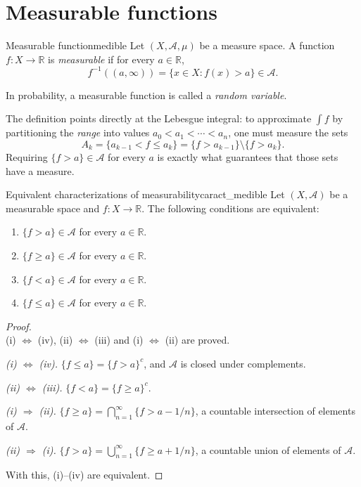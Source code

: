 \documentclass[11pt, a4paper]{article}
\begin{document}
\newpage

\section{Measurable functions}

\begin{definicion}{Measurable function}{medible}
Let $(X, \mathcal{A}, \mu)$ be a measure space. A function $f: X \to \mathbb{R}$ is
\emph{measurable} if for every $a \in \mathbb{R}$,
$$ f^{-1}((a, \infty)) = \{ x \in X : f(x) > a \} \in \mathcal{A}. $$
\end{definicion}

\obs In probability, a measurable function is called a \emph{random variable}.

\obs The definition points directly at the Lebesgue integral: to approximate $\int f$
by partitioning the \emph{range} into values $a_0 < a_1 < \cdots < a_n$, one must measure the sets
$$ A_k = \{a_{k-1} < f \le a_k\} = \{f > a_{k-1}\} \setminus \{f > a_k\}. $$
Requiring $\{f > a\} \in \mathcal{A}$ for every $a$ is exactly what guarantees that those
sets have a measure.

\begin{proposicion}{Equivalent characterizations of measurability}{caract_medible}
Let $(X, \mathcal{A})$ be a measurable space and $f: X \to \mathbb{R}$. The following conditions are
equivalent:
\begin{enumerate}
    \item $\{f > a\} \in \mathcal{A}$ for every $a \in \mathbb{R}$.
    \item $\{f \ge a\} \in \mathcal{A}$ for every $a \in \mathbb{R}$.
    \item $\{f < a\} \in \mathcal{A}$ for every $a \in \mathbb{R}$.
    \item $\{f \le a\} \in \mathcal{A}$ for every $a \in \mathbb{R}$.
\end{enumerate}
\end{proposicion}

\begin{proof}\leavevmode\\
(i) $\Leftrightarrow$ (iv), (ii) $\Leftrightarrow$ (iii) and (i) $\Leftrightarrow$ (ii) are proved.

\textit{(i) $\Leftrightarrow$ (iv).} $\{f \le a\} = \{f > a\}^c$, and $\mathcal{A}$ is closed under
complements.

\textit{(ii) $\Leftrightarrow$ (iii).} $\{f < a\} = \{f \ge a\}^c$.

\textit{(i) $\Rightarrow$ (ii).} $\{f \ge a\} = \bigcap_{n=1}^\infty \{f > a - 1/n\}$,
a countable
intersection of elements of $\mathcal{A}$.

\textit{(ii) $\Rightarrow$ (i).} $\{f > a\} = \bigcup_{n=1}^\infty \{f \ge a + 1/n\}$, a countable
union of elements of $\mathcal{A}$.

With this, (i)--(iv) are equivalent.
\end{proof}
\end{document}
